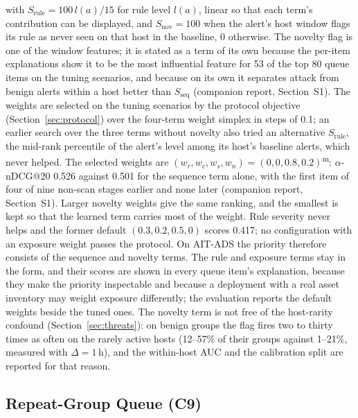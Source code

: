\documentclass[conference]{IEEEtran}
\newcommand{\meas}{\textsuperscript{\textcolor{green!45!black}{m}}}    %
\begin{document}
with $S_\mathrm{rule} = 100\, l(a)/15$ for rule level $l(a)$, linear so that each term's contribution can be displayed, and $S_\mathrm{nov} = 100$ when the alert's host window flags its rule as never seen on that host in the baseline, 0 otherwise. The novelty flag is one of the window features; it is stated as a term of its own because the per-item explanations show it to be the most influential feature for 53 of the top 80 queue items on the tuning scenarios, and because on its own it separates attack from benign alerts within a host better than $S_\mathrm{seq}$ (companion report, Section~S1). The weights are selected on the tuning scenarios by the protocol objective (Section~\ref{sec:protocol}) over the four-term weight simplex in steps of 0.1; an earlier search over the three terms without novelty also tried an alternative $S_\mathrm{rule}$, the mid-rank percentile of the alert's level among its host's baseline alerts, which never helped. The selected weights are $(w_r, w_c, w_s, w_n) = (0, 0, 0.8, 0.2)$\meas{}: $\alpha$-nDCG@20 0.526 against 0.501 for the sequence term alone, with the first item of four of nine non-scan stages earlier and none later (companion report, Section~S1). Larger novelty weights give the same ranking, and the smallest is kept so that the learned term carries most of the weight. Rule severity never helps and the former default $(0.3, 0.2, 0.5, 0)$ scores 0.417; no configuration with an exposure weight passes the protocol. On AIT-ADS the priority therefore consists of the sequence and novelty terms. The rule and exposure terms stay in the form, and their scores are shown in every queue item's explanation, because they make the priority inspectable and because a deployment with a real asset inventory may weight exposure differently; the evaluation reports the default weights beside the tuned ones. The novelty term is not free of the host-rarity confound (Section~\ref{sec:threats}): on benign groups the flag fires two to thirty times as often on the rarely active hosts (12--57\% of their groups against 1--21\%, measured with $\Delta = 1$\,h), and the within-host AUC and the calibration split are reported for that reason.

\subsection{Repeat-Group Queue (C9)}
\label{sec:queue}
\end{document}
